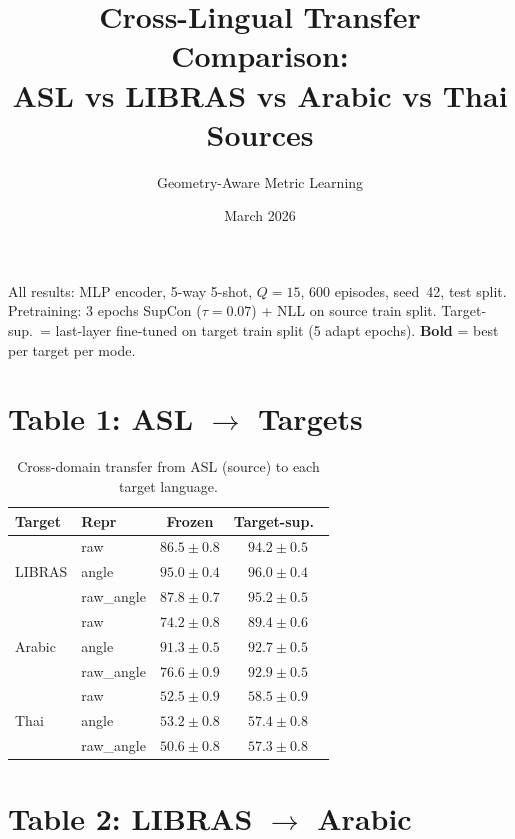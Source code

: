\documentclass[11pt,a4paper]{article}
\title{Cross-Lingual Transfer Comparison:\\ASL vs LIBRAS vs Arabic vs Thai Sources}
\author{Geometry-Aware Metric Learning}
\date{March 2026}
\begin{document}
\maketitle

\noindent
All results: MLP encoder, 5-way 5-shot, $Q{=}15$, 600 episodes, seed~42, test split.
Pretraining: 3 epochs SupCon ($\tau{=}0.07$) + NLL on source train split.
Target-sup.\ = last-layer fine-tuned on target train split (5 adapt epochs).
\textbf{Bold} = best per target per mode.

\vspace{-0.5em}
\section*{Table 1: ASL $\rightarrow$ Targets}
\vspace{-0.5em}

\begin{table}[H]
\centering
\small
\caption{Cross-domain transfer from ASL (source) to each target language.}
\label{tab:asl-transfer}
\begin{tabular}{@{}llcc@{}}
\toprule
Target & Repr & Frozen & Target-sup.\ \\
\midrule
\multirow{3}{*}{LIBRAS}
  & raw        & $86.5 \pm 0.8$ & $94.2 \pm 0.5$ \\
  & angle      & $\mathbf{95.0 \pm 0.4}$ & $\mathbf{96.0 \pm 0.4}$ \\
  & raw\_angle & $87.8 \pm 0.7$ & $95.2 \pm 0.5$ \\
\midrule
\multirow{3}{*}{Arabic}
  & raw        & $74.2 \pm 0.8$ & $89.4 \pm 0.6$ \\
  & angle      & $\mathbf{91.3 \pm 0.5}$ & $92.7 \pm 0.5$ \\
  & raw\_angle & $76.6 \pm 0.9$ & $\mathbf{92.9 \pm 0.5}$ \\
\midrule
\multirow{3}{*}{Thai}
  & raw        & $52.5 \pm 0.9$ & $\mathbf{58.5 \pm 0.9}$ \\
  & angle      & $\mathbf{53.2 \pm 0.8}$ & $57.4 \pm 0.8$ \\
  & raw\_angle & $50.6 \pm 0.8$ & $57.3 \pm 0.8$ \\
\bottomrule
\end{tabular}
\end{table}

\vspace{-0.5em}
\section*{Table 2: LIBRAS $\rightarrow$ Arabic}
\vspace{-0.5em}
\end{document}
